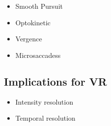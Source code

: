      \begin{itemize}
        \item Smooth Pursuit
        \item Optokinetic
        \item Vergence
        \item Microsaccadess
      \end{itemize}

    \subsection{Implications for VR}

      \begin{itemize}
        \item Intensity resolution
        \item Temporal resolution
      \end{itemize}

